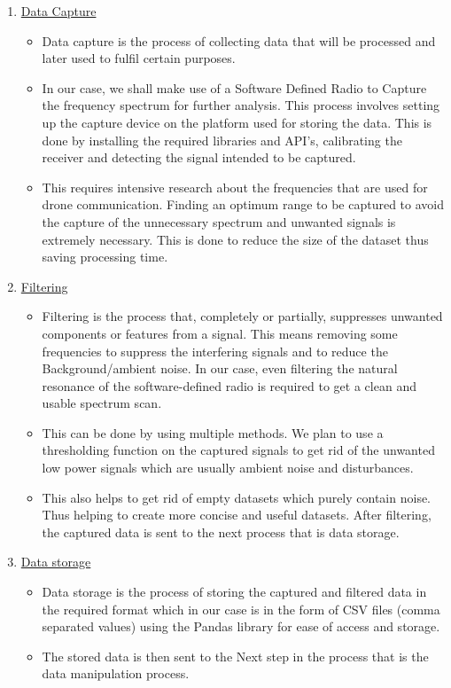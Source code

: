 \begin{enumerate}
  \item \underline {Data Capture}
\begin{itemize}
    \item Data capture is the process of collecting data that will be processed and later used to fulfil certain purposes.
    \item In our case, we shall make use of a Software Defined Radio to Capture the frequency spectrum for further analysis. This process involves setting up the capture device on the platform used for storing the data. This is done by installing the required libraries and API’s, calibrating the receiver and detecting the signal intended to be captured.

    \item This requires intensive research about the frequencies that are used for drone communication. Finding an optimum range to be captured to avoid the capture of the unnecessary spectrum and unwanted signals is extremely necessary. This is done to reduce the size of the dataset thus saving processing time.
\end{itemize}

  \item \underline {Filtering}
\begin{itemize}
    \item Filtering is the process that, completely or partially, suppresses unwanted components or features from a signal. This means removing some frequencies to suppress the interfering signals and to reduce the Background/ambient noise. In our case, even filtering the natural resonance of the software-defined radio is required to get a clean and usable spectrum scan.
    \item This can be done by using multiple methods. We plan to use a thresholding function on the captured signals to get rid of the unwanted low power signals which are usually ambient noise and disturbances.
    \item This also helps to get rid of empty datasets which purely contain noise. Thus helping to create more concise and useful datasets. After filtering, the captured data is sent to the next process that is data storage.
\end{itemize}
  \item \underline {Data storage}
\begin{itemize}
    \item Data storage is the process of storing the captured and filtered data in the required format which in our case is in the form of CSV files (comma separated values) using the Pandas library for ease of access and storage.
    \item The stored data is then sent to the Next step in the process that is the data manipulation process.
\end{itemize}


\end{enumerate}
